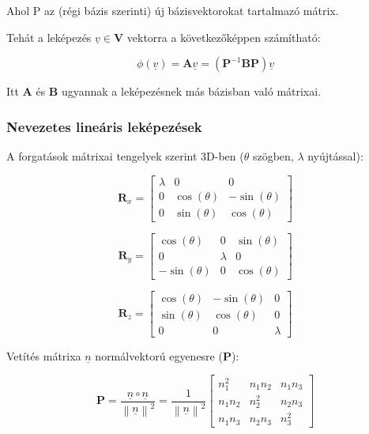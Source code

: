 \documentclass{article}
\begin{document}
Ahol P az (régi bázis szerinti) új bázisvektorokat tartalmazó mátrix.

Tehát a leképezés $\underline{v} \in \mathbf{V}$ vektorra a következőképpen számítható:

\begin{equation*}
    \phi(\underline{v}) = \mathbf{A}\underline{v} = (\mathbf{P}^{-1}\mathbf{B}\mathbf{P})\underline{v}
\end{equation*}

Itt $\mathbf{A}$ és $\mathbf{B}$ ugyannak a leképezésnek más bázisban való mátrixai.

\newpage

\subsubsection{Nevezetes lineáris leképezések}

A forgatások mátrixai tengelyek szerint 3D-ben ($\theta$ szögben, $\lambda$ nyújtással):

\begin{equation*}
    \mathbf{R}_x = \begin{bmatrix} \lambda & 0 & 0 \\ 0 & \cos(\theta) & -\sin(\theta) \\ 0 & \sin(\theta) & \cos(\theta) \end{bmatrix}
\end{equation*}

\begin{equation*}
    \mathbf{R}_y = \begin{bmatrix} \cos(\theta) & 0 & \sin(\theta) \\ 0 & \lambda & 0 \\ -\sin(\theta) & 0 & \cos(\theta) \end{bmatrix}
\end{equation*}

\begin{equation*}
    \mathbf{R}_z = \begin{bmatrix} \cos(\theta) & -\sin(\theta) & 0 \\ \sin(\theta) & \cos(\theta) & 0 \\ 0 & 0 & \lambda \end{bmatrix}
\end{equation*}

Vetítés mátrixa $\underline{n}$ normálvektorú egyenesre ($\mathbf{P}$):

\begin{equation*}
    \mathbf{P} = \frac{\underline{n} \circ \underline{n}}{\left\lVert \underline{n} \right\rVert^2} = \frac{1}{\left\lVert \underline{n} \right\rVert^2} \begin{bmatrix} n_1^2 & n_1n_2 & n_1n_3 \\ n_1n_2 & n_2^2 & n_2n_3 \\ n_1n_3 & n_2n_3 & n_3^2 \end{bmatrix}
\end{equation*}
\end{document}
